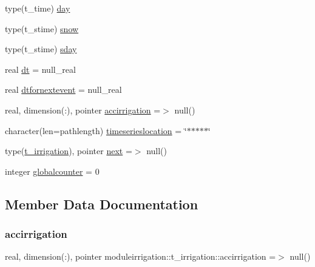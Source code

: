 \begin{DoxyCompactItemize}
\item 
type(t\+\_\+time) \mbox{\hyperlink{structmoduleirrigation_1_1t__irrigation_abe308b33307c30141576b87aa0990e22}{day}}
\item 
type(t\+\_\+stime) \mbox{\hyperlink{structmoduleirrigation_1_1t__irrigation_add0f7e4554ebc3b20cad35cb0786cb8e}{snow}}
\item 
type(t\+\_\+stime) \mbox{\hyperlink{structmoduleirrigation_1_1t__irrigation_a8a3ced4ff02c756434aa3095b4fd4556}{sday}}
\item 
real \mbox{\hyperlink{structmoduleirrigation_1_1t__irrigation_aa73749c6042e886f477caac8e1f2d3df}{dt}} = null\+\_\+real
\item 
real \mbox{\hyperlink{structmoduleirrigation_1_1t__irrigation_a837d1d2b062aaa4afb2dcded9a2f2aa3}{dtfornextevent}} = null\+\_\+real
\item 
real, dimension(\+:), pointer \mbox{\hyperlink{structmoduleirrigation_1_1t__irrigation_afc6fe628b41aeb51d76762d5ed7c32d9}{accirrigation}} =$>$ null()
\item 
character(len=pathlength) \mbox{\hyperlink{structmoduleirrigation_1_1t__irrigation_a91a8ebd2fe0de8e1ff0746a479705be3}{timeserieslocation}} = \char`\"{}$\ast$$\ast$$\ast$$\ast$$\ast$\char`\"{}
\item 
type(\mbox{\hyperlink{structmoduleirrigation_1_1t__irrigation}{t\+\_\+irrigation}}), pointer \mbox{\hyperlink{structmoduleirrigation_1_1t__irrigation_ad8021b8b7f0340b76dbfbab16e8e45da}{next}} =$>$ null()
\item 
integer \mbox{\hyperlink{structmoduleirrigation_1_1t__irrigation_a7db37799361a4d47aed1f0ea6f851dd2}{globalcounter}} = 0
\end{DoxyCompactItemize}


\subsection{Member Data Documentation}
\mbox{\label{structmoduleirrigation_1_1t__irrigation_afc6fe628b41aeb51d76762d5ed7c32d9}} 
\subsubsection{\texorpdfstring{accirrigation}{accirrigation}}
{\footnotesize\ttfamily real, dimension(\+:), pointer moduleirrigation\+::t\+\_\+irrigation\+::accirrigation =$>$ null()\hspace{0.3cm}{\ttfamily [private]}}

